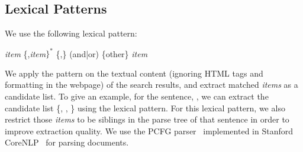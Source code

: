 \subsection{Lexical Patterns}
We use the following lexical pattern:
\begin{center}
\textit{item} \{,\textit{item}$\}^*$ \{,\} (and|or) \{other\} \textit{item} 
\end{center}
We apply the pattern on the textual content (ignoring HTML tags and formatting in the webpage) of the search results, and extract matched \textit{items} as a candidate list. To give an example, for the sentence, , we can extract the candidate list \{, , \} using the lexical pattern. For this lexical pattern, we also restrict those \textit{items} to be siblings in the parse tree of that sentence in order to improve extraction quality. We use the PCFG parser~\cite{klein2003accurate} implemented in Stanford CoreNLP~\cite{manning2014stanford} for parsing documents.

